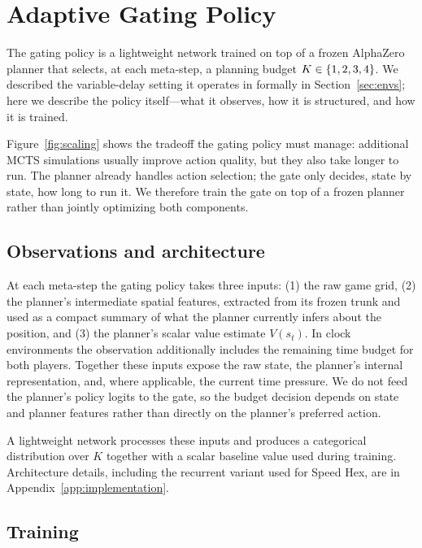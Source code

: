 \section{Adaptive Gating Policy}
\label{sec:method}

The gating policy is a lightweight network trained on top of a frozen
AlphaZero planner that selects, at each meta-step, a planning budget
$K \in \{1,2,3,4\}$.
We described the variable-delay setting it operates in formally in
Section~\ref{sec:envs}; here we describe the policy itself---what it
observes, how it is structured, and how it is trained.

Figure~\ref{fig:scaling} shows the tradeoff the gating policy must
manage: additional MCTS simulations usually improve action quality, but
they also take longer to run.
The planner already handles action selection; the gate only decides,
state by state, how long to run it.
We therefore train the gate on top of a frozen planner rather than
jointly optimizing both components.

\subsection{Observations and architecture}

At each meta-step the gating policy takes three inputs: (1) the raw
game grid, (2) the planner's intermediate spatial features, extracted
from its frozen trunk and used as a compact summary of what the planner
currently infers about the position, and (3) the planner's scalar value
estimate $V(s_t)$.
In clock environments the observation additionally includes the
remaining time budget for both players.
Together these inputs expose the raw state, the planner's internal
representation, and, where applicable, the current time pressure.
We do not feed the planner's policy logits to the gate, so the budget
decision depends on state and planner features rather than directly on
the planner's preferred action.

A lightweight network processes these inputs and produces a categorical
distribution over $K$ together with a scalar baseline value used during
training.
Architecture details, including the recurrent variant used for Speed
Hex, are in Appendix~\ref{app:implementation}.

\subsection{Training}

